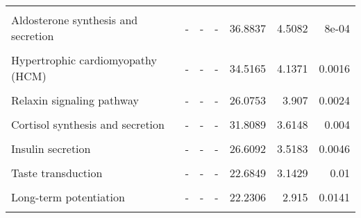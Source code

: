 \begin{table}[!htbp]
{\begin{tabular}[h]{p{10cm}rrrrrr}
\cellcolor{gray!6}{Parathyroid hormone synthesis, secretion and action} & \cellcolor{gray!6}{-} & \cellcolor{gray!6}{-} & \cellcolor{gray!6}{-} & \cellcolor{gray!6}{36.7548} & \cellcolor{gray!6}{4.6071} & \cellcolor{gray!6}{7e-04}\\
Aldosterone synthesis and secretion & - & - & - & 36.8837 & 4.5082 & 8e-04\\
\cellcolor{gray!6}{Calcium signaling pathway} & \cellcolor{gray!6}{-} & \cellcolor{gray!6}{-} & \cellcolor{gray!6}{-} & \cellcolor{gray!6}{25.4194} & \cellcolor{gray!6}{4.2394} & \cellcolor{gray!6}{0.0014}\\
Hypertrophic cardiomyopathy (HCM) & - & - & - & 34.5165 & 4.1371 & 0.0016\\
\cellcolor{gray!6}{Long-term depression} & \cellcolor{gray!6}{-} & \cellcolor{gray!6}{-} & \cellcolor{gray!6}{-} & \cellcolor{gray!6}{38.4978} & \cellcolor{gray!6}{3.9611} & \cellcolor{gray!6}{0.0023}\\
Relaxin signaling pathway & - & - & - & 26.0753 & 3.907 & 0.0024\\
\cellcolor{gray!6}{cAMP signaling pathway} & \cellcolor{gray!6}{-} & \cellcolor{gray!6}{-} & \cellcolor{gray!6}{-} & \cellcolor{gray!6}{20.7287} & \cellcolor{gray!6}{3.7944} & \cellcolor{gray!6}{0.0029}\\
Cortisol synthesis and secretion & - & - & - & 31.8089 & 3.6148 & 0.004\\
\cellcolor{gray!6}{Estrogen signaling pathway} & \cellcolor{gray!6}{-} & \cellcolor{gray!6}{-} & \cellcolor{gray!6}{-} & \cellcolor{gray!6}{22.6164} & \cellcolor{gray!6}{3.6038} & \cellcolor{gray!6}{0.004}\\
Insulin secretion & - & - & - & 26.6092 & 3.5183 & 0.0046\\
\cellcolor{gray!6}{Serotonergic synapse} & \cellcolor{gray!6}{-} & \cellcolor{gray!6}{-} & \cellcolor{gray!6}{-} & \cellcolor{gray!6}{20.72} & \cellcolor{gray!6}{3.228} & \cellcolor{gray!6}{0.0086}\\
Taste transduction & - & - & - & 22.6849 & 3.1429 & 0.01\\
\cellcolor{gray!6}{Gap junction} & \cellcolor{gray!6}{-} & \cellcolor{gray!6}{-} & \cellcolor{gray!6}{-} & \cellcolor{gray!6}{19.5286} & \cellcolor{gray!6}{2.8997} & \cellcolor{gray!6}{0.0141}\\
Long-term potentiation & - & - & - & 22.2306 & 2.915 & 0.0141\\
\cellcolor{gray!6}{Vascular smooth muscle contraction} & \cellcolor{gray!6}{-} & \cellcolor{gray!6}{-} & \cellcolor{gray!6}{-} & \cellcolor{gray!6}{16.7855} & \cellcolor{gray!6}{2.9181} & \cellcolor{gray!6}{0.0141}\\

\end{tabular}}
\end{table}
